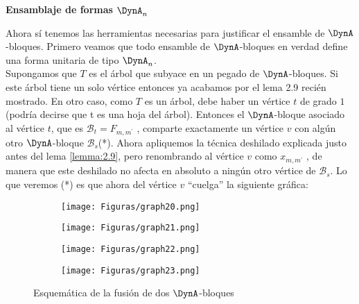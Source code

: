 \textbf{Ensamblaje de formas $\DynA_{n}$}

Ahora sí tenemos las herramientas necesarias para justificar el ensamble de $\DynA$-bloques. Primero veamos que todo ensamble de $\DynA$-bloques en verdad define una forma unitaria de tipo $\DynA_{n}$.\\

\newpage
Supongamos que $T$ es el árbol que subyace en un pegado de $\DynA$-bloques. Si este árbol tiene un solo vértice entonces ya acabamos por el lema 2.9 recién mostrado. En otro caso, como $T$ es un árbol, debe haber un vértice $t$ de grado $1$ (podría decirse que t es una hoja del árbol). Entonces el $\DynA$-bloque asociado al vértice $t$, que es $\mathcal{B}_{t} = F_{m, m^{'}}$ , comparte exactamente un vértice $v$ con algún otro $\DynA$-bloque  $\mathcal{B}_{s}$(*). Ahora apliquemos la técnica deshilado explicada justo antes del lema \ref{lemma:2.9}, pero renombrando al vértice $v$ como $x_{m, m^{'}}$ , de manera que este deshilado no afecta en absoluto a ningún otro vértice de $\mathcal{B}_{s}$. Lo que veremos (*) es que ahora del vértice $v$ “cuelga” la siguiente gráfica:
\begin{figure}[h]
    \begin{subfigure}[b]{0.2\textwidth}
      \begin{minipage}{4cm}
	\centering%
	    \texttt{[image: Figuras/graph20.png]}
	 \end{minipage}
	 \caption{}
     \end{subfigure}
     \begin{subfigure}[b]{0.2\textwidth}
        \begin{minipage}{4cm}
       	 \centering%
	    \texttt{[image: Figuras/graph21.png]}
        \end{minipage}
        \caption{}
     \end{subfigure}
     \begin{subfigure}[b]{0.2\textwidth}
        \begin{minipage}{4cm}
       	 \centering%
	    \texttt{[image: Figuras/graph22.png]}
        \end{minipage}
        \caption{}
     \end{subfigure}
      \begin{subfigure}[b]{0.2\textwidth}
      \begin{minipage}{4cm}
	\centering%
	    \texttt{[image: Figuras/graph23.png]}
	 \end{minipage}
	 \caption{}
     \end{subfigure}
     \caption{Esquemática de la fusión de dos $\DynA$-bloques}
    \label{figura:2.7}
\end{figure}
